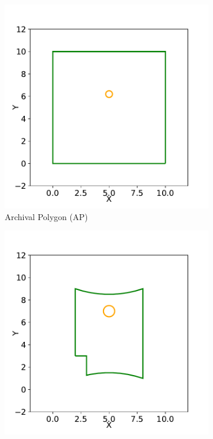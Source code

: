 
\begin{figure}[ht]
 \centering
  \begin{subfigure}[t]{.30\linewidth}
    \centering\includegraphics[clip, trim=0cm 0cm 0.0cm 0cm, width=.99\linewidth]{chapter_6_landingsim/figs/map_update_a.pdf}
    \caption{Archival Polygon (AP)\label{fig:ch6_map_update_a}}
  \end{subfigure}
  \begin{subfigure}[t]{.30\linewidth}
    \centering\includegraphics[clip, trim=0cm 0cm 0.0cm 0cm, width=.99\linewidth]{chapter_6_landingsim/figs/map_update_b.pdf}

\end{subfigure}
\end{figure}
